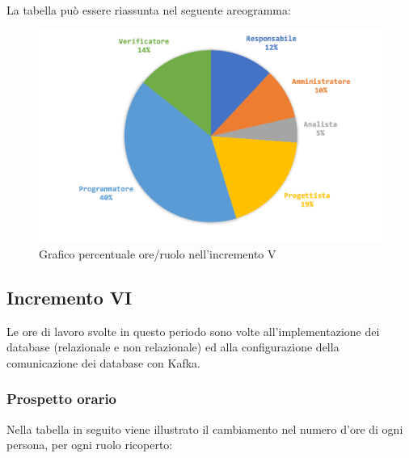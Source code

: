 			La tabella può essere riassunta nel seguente areogramma:
			\begin{figure}[H]
				\centering
				\includegraphics[width=0.8\linewidth]{images/consuntivo/ConsIncr5-2.png}
				\caption{Grafico percentuale ore/ruolo nell'incremento V}
				\label{fig:grafico costi ruolo incremento V}
			\end{figure}
			\pagebreak

		
		
		\subsection{Incremento VI}
		Le ore di lavoro svolte in questo periodo sono volte all'implementazione dei database (relazionale e non relazionale) ed alla configurazione della comunicazione dei database con Kafka.
		\subsubsection{Prospetto orario}
			Nella tabella in seguito viene illustrato il cambiamento nel numero d'ore di ogni persona, per ogni ruolo ricoperto:
			
